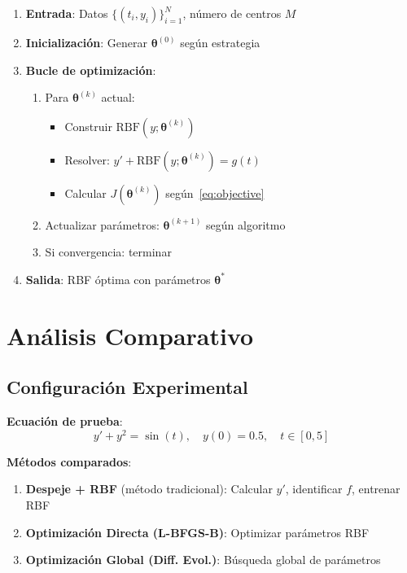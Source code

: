 \documentclass[11pt,a4paper]{article}
\begin{document}
\begin{enumerate}
    \item \textbf{Entrada}: Datos $\{(t_i, y_i)\}_{i=1}^{N}$, número de centros $M$

    \item \textbf{Inicialización}: Generar $\boldsymbol{\theta}^{(0)}$ según estrategia

    \item \textbf{Bucle de optimización}:
    \begin{enumerate}
        \item Para $\boldsymbol{\theta}^{(k)}$ actual:
        \begin{itemize}
            \item Construir $\text{RBF}(y; \boldsymbol{\theta}^{(k)})$
            \item Resolver: $y' + \text{RBF}(y; \boldsymbol{\theta}^{(k)}) = g(t)$
            \item Calcular $J(\boldsymbol{\theta}^{(k)})$ según~\eqref{eq:objective}
        \end{itemize}
        \item Actualizar parámetros: $\boldsymbol{\theta}^{(k+1)}$ según algoritmo
        \item Si convergencia: terminar
    \end{enumerate}

    \item \textbf{Salida}: RBF óptima con parámetros $\boldsymbol{\theta}^*$
\end{enumerate}

\section{Análisis Comparativo}

\subsection{Configuración Experimental}

\textbf{Ecuación de prueba}:
\begin{equation}
y' + y^2 = \sin(t), \quad y(0) = 0.5, \quad t \in [0, 5]
\end{equation}

\textbf{Métodos comparados}:
\begin{enumerate}
    \item \textbf{Despeje + RBF} (método tradicional): Calcular $y'$, identificar $f$, entrenar RBF
    \item \textbf{Optimización Directa (L-BFGS-B)}: Optimizar parámetros RBF
    \item \textbf{Optimización Global (Diff. Evol.)}: Búsqueda global de parámetros
\end{enumerate}
\end{document}
